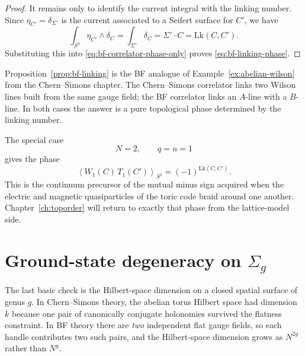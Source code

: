 \begin{proof}
\medskip

\noindent It remains only to identify the current integral with the linking number. Since $\eta_{C'}=\delta_{\Sigma'}$ is the current associated to a Seifert surface for $C'$, we have
\begin{equation*}
\int_{S^3}\eta_{C'}\wedge \delta_C
=
\int_{\Sigma'} \delta_C
=
\Sigma'\cdot C
=
\mathrm{Lk}(C,C').
\end{equation*}
Substituting this into \eqref{eq:bf-correlator-phase-only} proves \eqref{eq:bf-linking-phase}.
\end{proof}

\begin{remark}\label{rem:bf-linking-physics}
Proposition~\ref{prop:bf-linking} is the BF analogue of Example~\ref{ex:abelian-wilson} from the Chern--Simons chapter. The Chern--Simons correlator links two Wilson lines built from the same gauge field; the BF correlator links an $A$-line with a $B$-line. In both cases the answer is a pure topological phase determined by the linking number.

\medskip

\noindent The special case
\begin{equation*}
N=2,
\qquad
q=n=1
\end{equation*}
gives the phase
\begin{equation*}
\left\langle W_1(C)\,T_1(C')\right\rangle_{S^3}
=
(-1)^{\mathrm{Lk}(C,C')}.
\end{equation*}
This is the continuum precursor of the mutual minus sign acquired when the electric and magnetic quasiparticles of the toric code braid around one another. Chapter~\ref{ch:toporder} will return to exactly that phase from the lattice-model side.
\end{remark}

\section{Ground-state degeneracy on \texorpdfstring{$\Sigma_g$}{Sigma\_g}}\label{sec:bf-gsd}

The last basic check is the Hilbert-space dimension on a closed spatial surface of genus $g$. In Chern--Simons theory, the abelian torus Hilbert space had dimension $k$ because one pair of canonically conjugate holonomies survived the flatness constraint. In BF theory there are \emph{two} independent flat gauge fields, so each handle contributes two such pairs, and the Hilbert-space dimension grows as $N^{2g}$ rather than $N^g$.

